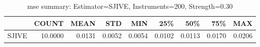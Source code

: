 \begin{table}[ht]
\centering
\caption{mse summary: Estimator=SJIVE, Instruments=200, Strength=0.30}
\begin{tabular}{lrrrrrrrr}
\toprule
 & COUNT & MEAN & STD & MIN & 25\% & 50\% & 75\% & MAX \\
\midrule
SJIVE & 10.0000 & 0.0131 & 0.0052 & 0.0054 & 0.0102 & 0.0113 & 0.0170 & 0.0206 \\
\bottomrule
\end{tabular}
\end{table}
